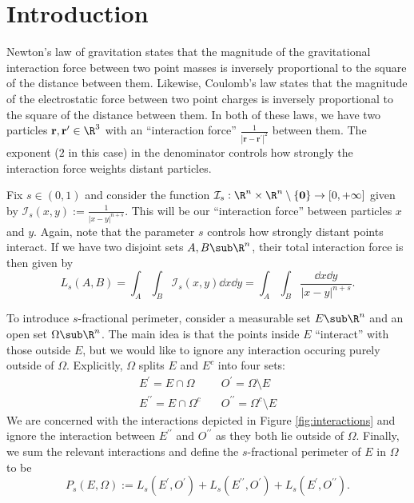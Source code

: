 \documentclass[../main.tex]{subfiles}
\begin{document}
\section{Introduction}

Newton's law of gravitation states that the magnitude of the gravitational interaction force between two point masses is inversely proportional to the square of the distance between them. Likewise, Coulomb's law states that the magnitude of the electrostatic force between two point charges is inversely proportional to the square of the distance between them. In both of these laws, we have two particles $ \mathbf{r},\mathbf{r^{\prime}}\in \R^{3} $ with an ``interaction force'' $  \frac{1}{|\mathbf{r}-\mathbf{r^{\prime}}|^{2}} $ between them. The exponent ($ 2 $ in this case) in the denominator controls how strongly the interaction force weights distant particles. 

Fix $ s\in (0,1) $ and consider the function $ \mathcal{I}_s:\R^{n}\times\R^{n}\setminus \{\mathbf{0}\}\to [0,+\infty] $ given by $ \mathcal{I}_{s}(x,y):= \frac{1}{|x-y|^{n+s}} $. This will be our ``interaction force'' between particles $ x $ and $ y $. Again, note that the parameter $ s $ controls how strongly distant points interact. If we have two disjoint sets $ A,B\sub \R^{n} $, their total interaction force is then given by
\[
    L_{s}(A,B) = \int_{A}\int_{B} \mathcal{I}_{s}(x,y) \dd{x}\dd{y} = \int_{A}\int_{B}\frac{\dd{x}\dd{y}}{|x-y|^{n+s}}.
\]

To introduce $ s $-fractional perimeter, consider a measurable set $ E\sub \R^{n} $ and an open set $ \Omega\sub \R^{n} $. The main idea is that the points inside $ E $ ``interact'' with those outside $ E $, but we would like to ignore any interaction occuring purely outside of $ \Omega $. Explicitly, $ \Omega $ splits $ E $ and $ E^{c} $ into four sets: 
\begin{align*}
    E^{\prime} = E\cap \Omega &\quad O^{\prime} = \Omega\setminus E\\ 
    E^{\prime\prime} = E\cap \Omega^{c} &\quad O^{\prime\prime} = \Omega^{c}\setminus E
\end{align*}
We are concerned with the interactions depicted in Figure \ref{fig:interactions} and ignore the interaction between $ E^{\prime\prime} $ and $ O^{\prime\prime} $ as they both lie outside of $ \Omega $. Finally, we sum the relevant interactions and define the $ s $-fractional perimeter of $ E $ in $ \Omega $ to be
\[
    P_{s}(E,\Omega) := L_{s}(E^{\prime}, O^{\prime}) + L_{s}(E^{\prime\prime}, O^{\prime}) + L_{s}(E^{\prime}, O^{\prime\prime}).
\]
\end{document}
